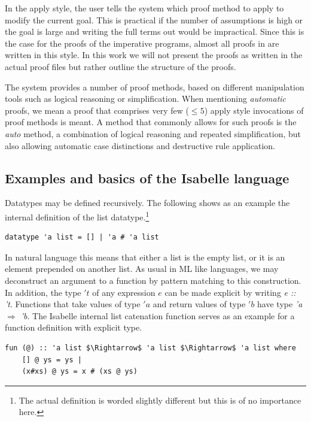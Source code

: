 In the apply style, the user tells the system which proof method
to apply to modify the current goal.
This is practical if the number of assumptions
is high or the goal is large and writing the full terms
out would be impractical.
Since this is the case for the proofs of the imperative programs,
almost all proofs in  are written in this style.
In this work we will not present the proofs as written in the actual
proof files but rather outline the structure of the proofs.

The system provides a number of proof methods,
based on different manipulation tools
such as logical reasoning or simplification.
When mentioning \textit{automatic} proofs, we mean a proof that
comprises very few ($\le 5$) apply style
invocations of proof methods is meant.
A method that commonly allows for such proofs is the \textit{auto} method,
a combination of logical reasoning and repeated simplification,
but also allowing automatic case distinctions and destructive rule application.

\subsection{Examples and basics of the Isabelle language}

Datatypes may be defined recursively.
The following shows as an example the internal definition of the list datatype.\footnote{
    The actual definition is worded slightly different but this is of no importance here.
}

\begin{lstlisting}[mathescape=true, language=Isabelle,label=lst:list-def]
datatype 'a list = [] | 'a # 'a list
\end{lstlisting}

In natural language this means that either a list is the empty list,
or it is an element prepended on another list.
As usual in ML like languages, we may deconstruct an argument to a function
by pattern matching to this construction.
In addition, the type $'t$ of any expression $e$ can be
made explicit by writing \textit{e :: 't}.
Functions that take values of type $'a$ and return values of type $'b$ 
have type \textit{'a $\Rightarrow$ 'b}.
The Isabelle internal list catenation function serves as
an example for a function definition with explicit type.

\begin{lstlisting}[mathescape=true, language=Isabelle,label=lst:append-def]
fun (@) :: 'a list $\Rightarrow$ 'a list $\Rightarrow$ 'a list where
    [] @ ys = ys |
    (x#xs) @ ys = x # (xs @ ys)
\end{lstlisting}

